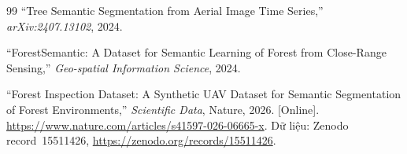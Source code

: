 \begin{thebibliography}{99}
``Tree Semantic Segmentation from Aerial Image Time Series,''
\textit{arXiv:2407.13102}, 2024.

``ForestSemantic: A Dataset for Semantic Learning of Forest from Close-Range Sensing,''
\textit{Geo-spatial Information Science}, 2024.

``Forest Inspection Dataset: A Synthetic UAV Dataset for Semantic Segmentation of
Forest Environments,'' \textit{Scientific Data}, Nature, 2026.
[Online]. \url{https://www.nature.com/articles/s41597-026-06665-x}.
Dữ liệu: Zenodo record~15511426, \url{https://zenodo.org/records/15511426}.


\end{thebibliography}
